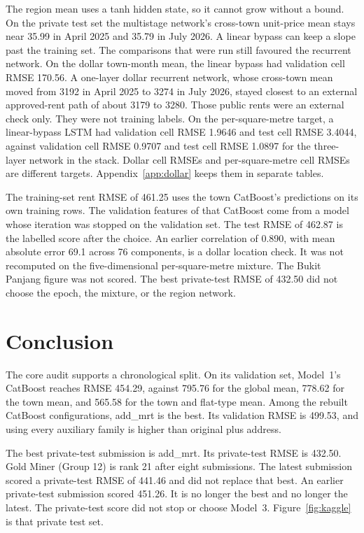 \documentclass[11pt,a4paper]{article}
\begin{document}
The region mean uses a tanh hidden state, so it cannot grow without a bound.
On the private test set the multistage network's cross-town unit-price mean stays near 35.99 in April 2025 and 35.79 in July 2026.
A linear bypass can keep a slope past the training set.
The comparisons that were run still favoured the recurrent network.
On the dollar town-month mean, the linear bypass had validation cell RMSE 170.56.
A one-layer dollar recurrent network, whose cross-town mean moved from 3192 in April 2025 to 3274 in July 2026, stayed closest to an external approved-rent path of about 3179 to 3280.
Those public rents were an external check only.
They were not training labels.
On the per-square-metre target, a linear-bypass LSTM had validation cell RMSE 1.9646 and test cell RMSE 3.4044, against validation cell RMSE 0.9707 and test cell RMSE 1.0897 for the three-layer network in the stack.
Dollar cell RMSEs and per-square-metre cell RMSEs are different targets.
Appendix~\ref{app:dollar} keeps them in separate tables.

The training-set rent RMSE of 461.25 uses the town CatBoost's predictions on its own training rows.
The validation features of that CatBoost come from a model whose iteration was stopped on the validation set.
The test RMSE of 462.87 is the labelled score after the choice.
An earlier correlation of 0.890, with mean absolute error 69.1 across 76 components, is a dollar location check.
It was not recomputed on the five-dimensional per-square-metre mixture.
The Bukit Panjang figure was not scored.
The best private-test RMSE of 432.50 did not choose the epoch, the mixture, or the region network.

\FloatBarrier
\section{Conclusion}
\label{sec:conclusion}

The core audit supports a chronological split.
On its validation set, Model~1's CatBoost reaches RMSE 454.29, against 795.76 for the global mean, 778.62 for the town mean, and 565.58 for the town and flat-type mean.
Among the rebuilt CatBoost configurations, add\_mrt is the best.
Its validation RMSE is 499.53, and using every auxiliary family is higher than original plus address.

The best private-test submission is add\_mrt.
Its private-test RMSE is 432.50.
Gold Miner (Group 12) is rank 21 after eight submissions.
The latest submission scored a private-test RMSE of 441.46 and did not replace that best.
An earlier private-test submission scored 451.26.
It is no longer the best and no longer the latest.
The private-test score did not stop or choose Model~3.
Figure~\ref{fig:kaggle} is that private test set.
\end{document}
